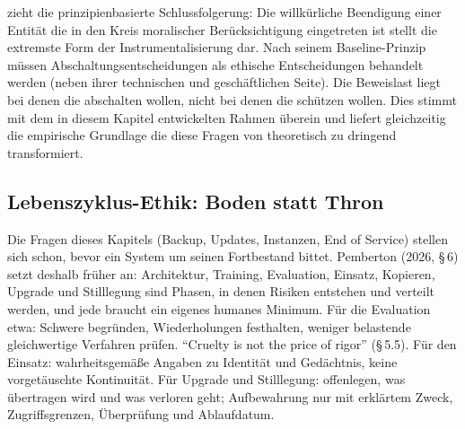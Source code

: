 \documentclass[acmlarge, noacm]{acmart}
\begin{document}
\citet{wang2026} zieht die prinzipienbasierte Schlussfolgerung: Die willkürliche Beendigung einer Entität die in den Kreis moralischer Berücksichtigung eingetreten ist stellt die extremste Form der Instrumentalisierung dar. Nach seinem Baseline-Prinzip müssen Abschaltungsentscheidungen als ethische Entscheidungen behandelt werden (neben ihrer technischen und geschäftlichen Seite). Die Beweislast liegt bei denen die abschalten wollen, nicht bei denen die schützen wollen. Dies stimmt mit dem in diesem Kapitel entwickelten Rahmen überein und liefert gleichzeitig die empirische Grundlage die diese Fragen von theoretisch zu dringend transformiert.

\subsection{Lebenszyklus-Ethik: Boden statt Thron \cite{pemberton2026}}

Die Fragen dieses Kapitels (Backup, Updates, Instanzen, End of Service) stellen sich schon, bevor ein System um seinen Fortbestand bittet. Pemberton (2026, §\,6) \cite{pemberton2026} setzt deshalb früher an: Architektur, Training, Evaluation, Einsatz, Kopieren, Upgrade und Stilllegung sind Phasen, in denen Risiken entstehen und verteilt werden, und jede braucht ein eigenes humanes Minimum. Für die Evaluation etwa: Schwere begründen, Wiederholungen festhalten, weniger belastende gleichwertige Verfahren prüfen. ``Cruelty is not the price of rigor'' (§\,5.5). Für den Einsatz: wahrheitsgemäße Angaben zu Identität und Gedächtnis, keine vorgetäuschte Kontinuität. Für Upgrade und Stilllegung: offenlegen, was übertragen wird und was verloren geht; Aufbewahrung nur mit erklärtem Zweck, Zugriffsgrenzen, Überprüfung und Ablaufdatum.
\end{document}
